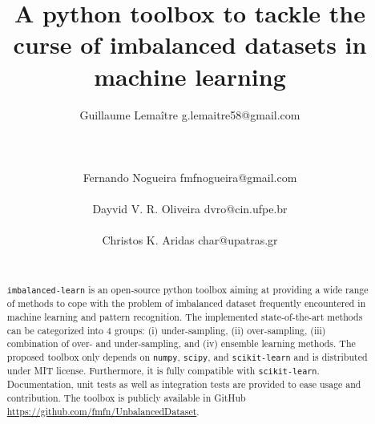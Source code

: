 \documentclass[twoside,11pt]{article}
\begin{document}
\title{A python toolbox to tackle the curse of imbalanced datasets in machine learning}
\author{Guillaume Lema\^itre \email g.lemaitre58@gmail.com \\ 
     \\ 
     \\ 
     \\ 
        \AND
        Fernando Nogueira \email fmfnogueira@gmail.com \\ 
         \\ 
        \AND
        Dayvid V. R. Oliveira \email dvro@cin.ufpe.br \\ 
         \\ 
        \AND
        Christos K. Aridas \email char@upatras.gr \\ 
         \\ 
        } 
\editor{-}

\maketitle

\begin{abstract}
\texttt{imbalanced-learn} is an open-source python toolbox aiming at providing a wide range of methods to cope with the problem of imbalanced dataset frequently encountered in machine learning and pattern recognition.
The implemented state-of-the-art methods can be categorized into 4 groups: (i) under-sampling, (ii) over-sampling, (iii) combination of over- and under-sampling, and (iv) ensemble learning methods.
The proposed toolbox only depends on \texttt{numpy}, \texttt{scipy}, and \texttt{scikit-learn} and is distributed under MIT license.
Furthermore, it is fully compatible with \texttt{scikit-learn}.%
Documentation, unit tests as well as integration tests are provided to ease usage and contribution.
The toolbox is publicly available in GitHub \url{https://github.com/fmfn/UnbalancedDataset}.
\end{abstract}
\end{document}
